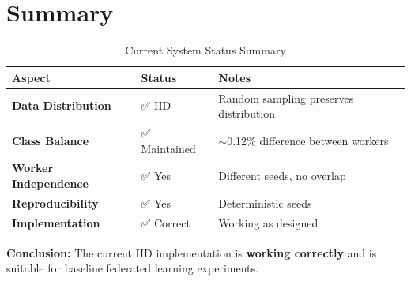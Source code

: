 \documentclass[12pt]{article}
\begin{document}
\section{Summary}

\begin{table}[h]
\centering
\begin{tabular}{|l|l|l|}
\hline
\textbf{Aspect} & \textbf{Status} & \textbf{Notes} \\
\hline
\textbf{Data Distribution} & ✅ IID & Random sampling preserves distribution \\
\hline
\textbf{Class Balance} & ✅ Maintained & $\sim$0.12\% difference between workers \\
\hline
\textbf{Worker Independence} & ✅ Yes & Different seeds, no overlap \\
\hline
\textbf{Reproducibility} & ✅ Yes & Deterministic seeds \\
\hline
\textbf{Implementation} & ✅ Correct & Working as designed \\
\hline
\end{tabular}
\caption{Current System Status Summary}
\end{table}

\textbf{Conclusion:} The current IID implementation is \textbf{working correctly} and is suitable for baseline federated learning experiments.
\end{document}
